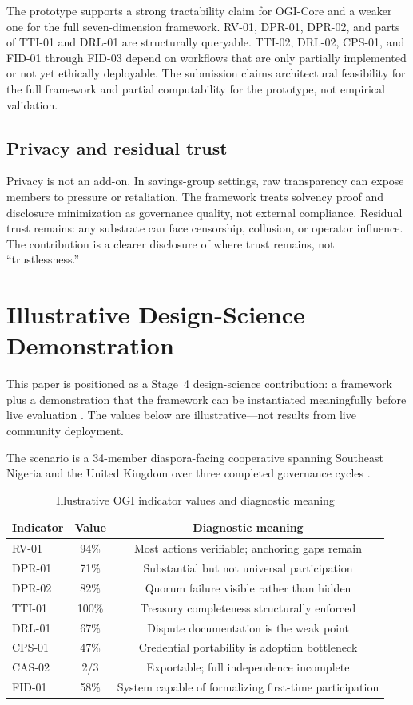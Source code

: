 \documentclass[sigconf,anonymous]{acmart}
\begin{document}
The prototype supports a strong tractability claim for OGI-Core and a weaker one for the full seven-dimension framework. RV-01, DPR-01, DPR-02, and parts of TTI-01 and DRL-01 are structurally queryable. TTI-02, DRL-02, CPS-01, and FID-01 through FID-03 depend on workflows that are only partially implemented or not yet ethically deployable. The submission claims architectural feasibility for the full framework and partial computability for the prototype, not empirical validation.

\subsection{Privacy and residual trust}

Privacy is not an add-on. In savings-group settings, raw transparency can expose members to pressure or retaliation. The framework treats solvency proof and disclosure minimization as governance quality, not external compliance. Residual trust remains: any substrate can face censorship, collusion, or operator influence. The contribution is a clearer disclosure of where trust remains, not ``trustlessness.''

\section{Illustrative Design-Science Demonstration}

This paper is positioned as a Stage~4 design-science contribution: a framework plus a demonstration that the framework can be instantiated meaningfully before live evaluation \cite{hevner2004,peffers2007,gregor2013}. The values below are illustrative---not results from live community deployment.

The scenario is a 34-member diaspora-facing cooperative spanning Southeast Nigeria and the United Kingdom over three completed governance cycles \cite{besley1993,gugerty2007}.

\begin{table}[h]
\caption{Illustrative OGI indicator values and diagnostic meaning}
\label{tab:demo}
\small
\begin{tabular}{lcc}
\toprule
Indicator & Value & Diagnostic meaning \\
\midrule
RV-01  & 94\% & Most actions verifiable; anchoring gaps remain \\
DPR-01 & 71\% & Substantial but not universal participation \\
DPR-02 & 82\% & Quorum failure visible rather than hidden \\
TTI-01 & 100\% & Treasury completeness structurally enforced \\
DRL-01 & 67\% & Dispute documentation is the weak point \\
CPS-01 & 47\% & Credential portability is adoption bottleneck \\
CAS-02 & 2/3  & Exportable; full independence incomplete \\
FID-01 & 58\% & System capable of formalizing first-time participation \\
\bottomrule
\end{tabular}
\end{table}
\end{document}
